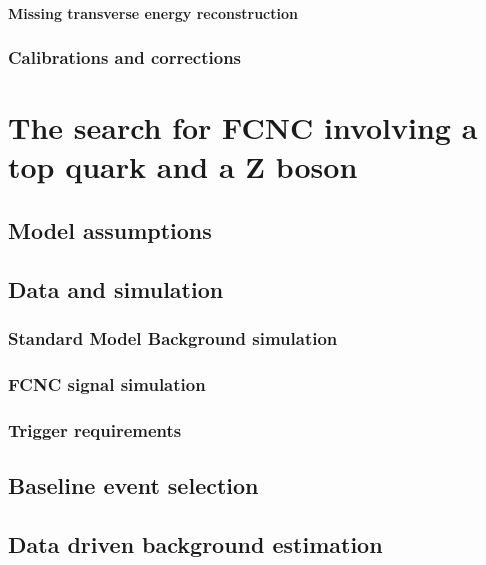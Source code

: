 \subsubsection{Missing transverse energy reconstruction}
\subsection{Calibrations and corrections}
\chapter{The search for FCNC involving a top quark and a Z boson}
\section{Model assumptions}
\section{Data and simulation}
\subsection{Standard Model Background simulation}


\subsection{FCNC signal simulation}
\subsection{Trigger requirements}
\section{Baseline event selection}
\section{Data driven background estimation}
